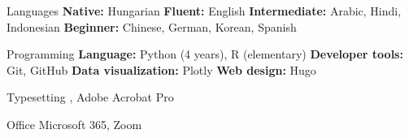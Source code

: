 
\begin{cvskills}
   

  \cvskill
    {Languages}
    {\textbf{Native:} Hungarian \textbf{Fluent:} English \textbf{Intermediate:} Arabic, Hindi, Indonesian \textbf{Beginner:} Chinese, German, Korean, Spanish} %
    
  \cvskill
    {Programming}
    {\textbf{Language:} Python (4 years), R (elementary) \textbf{Developer tools:} Git, GitHub \textbf{Data visualization:} Plotly \textbf{Web design:} Hugo} %

  \cvskill
    {Typesetting}
    {\textrm{}, Adobe Acrobat Pro}

  \cvskill
    {Office}
    {Microsoft 365, Zoom}
\end{cvskills}
